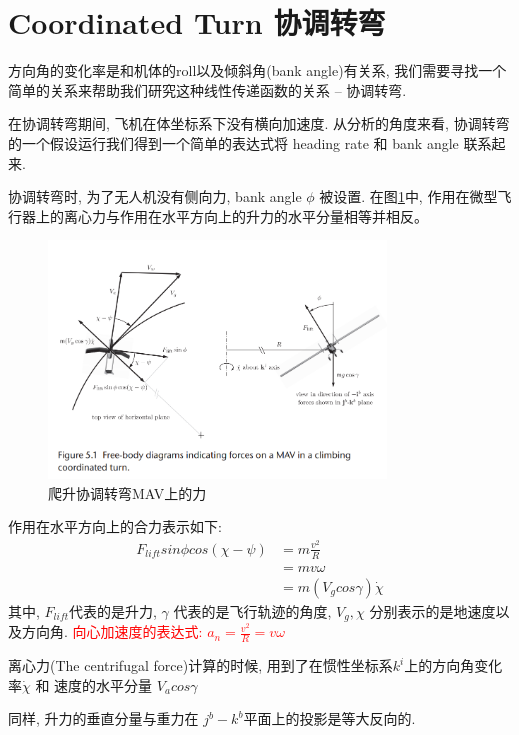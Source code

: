 \documentclass[UTF8,a4paper,10pt,nocolorlinks]{ctexart}
\begin{document}
    \section{Coordinated Turn 协调转弯}
    方向角的变化率是和机体的roll以及倾斜角(bank angle)有关系, 我们需要寻找一个简单的关系来帮助我们研究这种线性传递函数的关系 -- 协调转弯. \par
    在协调转弯期间, 飞机在体坐标系下没有横向加速度. 从分析的角度来看, 协调转弯的一个假设运行我们得到一个简单的表达式将 heading rate 和 bank angle 联系起来. \par
    协调转弯时, 为了无人机没有侧向力, bank angle $\phi$ 被设置.
    在图\ref{fig:1}中, 作用在微型飞行器上的离心力与作用在水平方向上的升力的水平分量相等并相反。
    \begin{figure}[htpb]
        \centering
        \includegraphics[width=0.8\textwidth]{pictures/5_1.png}
        \caption{爬升协调转弯MAV上的力}
        \label{fig:1}
    \end{figure}
    \par 作用在水平方向上的合力表示如下: 
    \begin{align}
        F_{lift} sin \phi cos (\chi - \psi) &= m \frac{v^{2}}{R} \nonumber \\
        &= m v \omega \nonumber \\
        &= m (V_{g} cos \gamma) \dot{\chi} 
        \label{equ:1}
    \end{align}
    其中, $F_{lift}$代表的是升力, $\gamma$ 代表的是飞行轨迹的角度, $V_{g}, \chi$ 分别表示的是地速度以及方向角. \textcolor{red}{向心加速度的表达式: $a_{n} = \frac{v^{2}}{R} = v \omega$}
    \par 离心力(The centrifugal force)计算的时候, 用到了在惯性坐标系$k^{i}$上的方向角变化率$\dot{\chi}$ 和 速度的水平分量 $V_{a}cos \gamma$
    \par 同样, 升力的垂直分量与重力在 $j^{b} - k^{b}$平面上的投影是等大反向的. 
\end{document}

